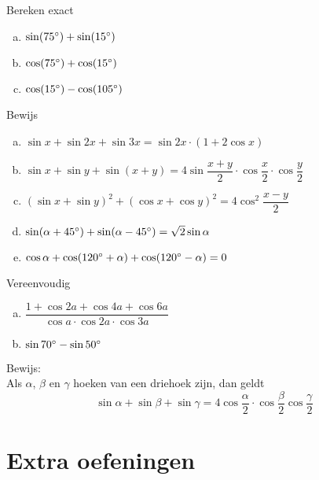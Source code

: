 \documentclass[a4paper,12pt]{article}
\begin{document}
\begin{oefening}
Bereken exact
\begin{enumerate}[(a)]
\itemsep.5em
  \item $\sin(75^\circ)+\sin(15^\circ)$
  \item $\cos(75^\circ)+\cos(15^\circ)$
  \item $\cos(15^\circ)-\cos(105^\circ)$
\end{enumerate}
\end{oefening}

\begin{oefening}
Bewijs
\begin{enumerate}[(a)]
\itemsep.5em
  \item $\sin x + \sin 2x + \sin 3x = \sin 2x \cdot (1 + 2\cos x)$
  \item $\sin x + \sin y + \sin(x+y) = 4\sin\dfrac{x+y}{2}\cdot\cos\dfrac{x}{2}\cdot\cos\dfrac{y}{2}$
  \item $\left(\sin x + \sin y\right)^2 + \left(\cos x + \cos y\right)^2 = 4\cos^2\dfrac{x-y}{2}$
  \item $\sin(\alpha + 45^\circ) + \sin(\alpha - 45^\circ) = \sqrt{2}\sin\alpha$
  \item $\cos \alpha + \cos(120^\circ + \alpha) + \cos(120^\circ - \alpha) = 0$
\end{enumerate}
\end{oefening}

\begin{oefening}
Vereenvoudig\\
\begin{enumerate}[(a)]
\itemsep.8em
  \item $\dfrac{1+\cos 2a + \cos 4a + \cos 6a}{\cos a \cdot \cos 2a \cdot \cos 3a}$
  \item $\sin 70^\circ - \sin 50^\circ$
\end{enumerate}
\end{oefening}

 \begin{oefening}Bewijs:\\
 Als $\alpha$, $\beta$ en $\gamma$ hoeken van een driehoek zijn, dan geldt
 $$\sin\alpha + \sin\beta + \sin\gamma = 4 \cos\dfrac{\alpha}{2}\cdot\cos\dfrac{\beta}{2}\cos\dfrac{\gamma}{2}$$
 \end{oefening}

\pagebreak
\section{Extra oefeningen}
\end{document}
